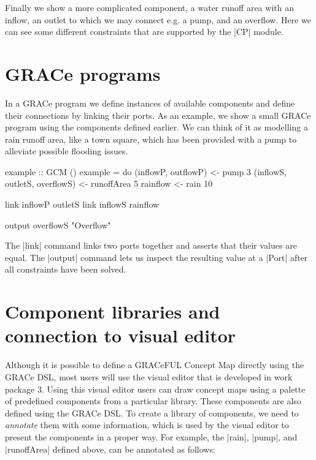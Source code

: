 \documentclass[a4paper]{article}
\begin{document}
Finally we show a more complicated component, a water runoff area with an
inflow, an outlet to which we may connect e.g. a pump, and an overflow. Here we
can see some different constraints that are supported by the |CP| module.

\section{GRACe programs}

In a GRACe program we define instances of available components and define their
connections by linking their ports. As an example, we show a small GRACe program
using the components defined earlier. We can think of it as modelling a rain
runoff area, like a town square, which has been provided with a pump to
alleviate possible flooding issues.
\begin{haskellcode}
example :: GCM ()
example = do
  (inflowP, outflowP) <- pump 3
  (inflowS, outletS, overflowS) <- runoffArea 5
  rainflow <- rain 10

  link inflowP outletS
  link inflowS rainflow

  output overflowS "Overflow"
\end{haskellcode}
The |link| command links two ports together and asserts that their values are
equal. The |output| command lets us inspect the resulting value at a |Port|
after all constraints have been solved.

\section{Component libraries and connection to visual editor}
Although it is possible to define a GRACeFUL Concept Map directly using the
GRACe DSL, most users will use the visual editor that is developed in work
package 3. Using this visual editor users can draw concept maps using a palette
of predefined components from a particular library. These components are also
defined using the GRACe DSL. To create a library of components, we need to
\emph{annotate} them with some information, which is used by the visual editor
to present the components in a proper way. For example, the |rain|, |pump|, and
|runoffArea| defined above, can be annotated as follows:
\end{document}

